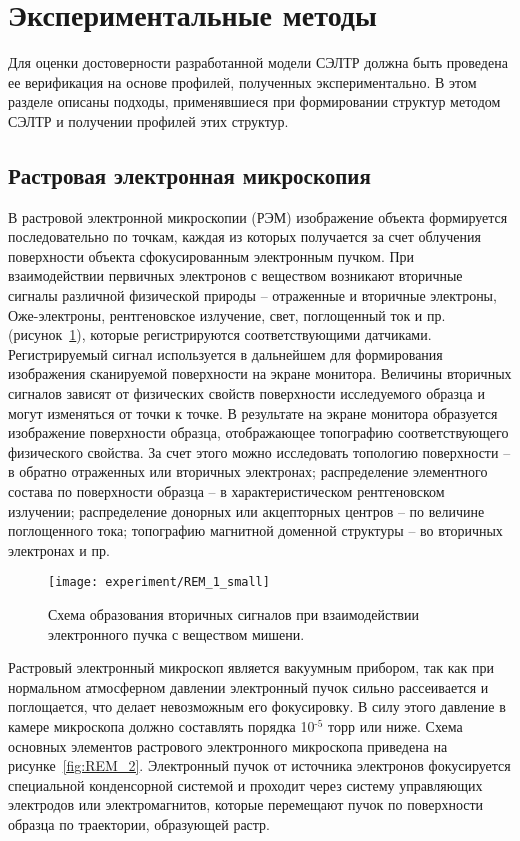\section{Экспериментальные методы}

Для оценки достоверности разработанной модели СЭЛТР должна быть проведена ее верификация на основе профилей, полученных экспериментально. В этом разделе описаны подходы, применявшиеся при формировании структур методом СЭЛТР и получении профилей этих структур.

\subsection*{Растровая электронная микроскопия}

В растровой электронной микроскопии (РЭМ) изображение объекта формируется последовательно по точкам, каждая из которых получается за счет облучения поверхности объекта сфокусированным электронным пучком. При взаимодействии первичных электронов с веществом возникают вторичные сигналы различной физической природы -- отраженные и вторичные электроны, Оже-электроны, рентгеновское излучение, свет, поглощенный ток и пр. (рисунок~\ref{fig:REM_1}), которые регистрируются соответствующими датчиками. Регистрируемый сигнал используется в дальнейшем для формирования изображения сканируемой поверхности на экране монитора. Величины вторичных сигналов зависят от физических свойств поверхности исследуемого образца и могут изменяться от точки к точке. В результате на экране монитора образуется изображение поверхности образца, отображающее топографию соответствующего физического свойства. За счет этого можно исследовать топологию поверхности -- в обратно отраженных или вторичных электронах; распределение элементного состава по поверхности образца -- в характеристическом рентгеновском излучении; распределение донорных или акцепторных центров -- по величине поглощенного тока; топографию магнитной доменной структуры -- во вторичных электронах и пр.

\begin{figure}
	\centering
	\texttt{[image: experiment/REM\_1\_small]}
	\caption{Схема образования вторичных сигналов при взаимодействии электронного пучка с веществом мишени.}
	\label{fig:REM_1}
\end{figure}

Растровый электронный микроскоп является вакуумным прибором, так как при нормальном атмосферном давлении электронный пучок сильно рассеивается и поглощается, что делает невозможным его фокусировку. В силу этого давление в камере микроскопа должно составлять порядка 10$^\text{-5}$ торр или ниже. Схема основных элементов растрового электронного микроскопа приведена на рисунке~\ref{fig:REM_2}. Электронный пучок от источника электронов фокусируется специальной конденсорной системой и проходит через систему управляющих электродов или электромагнитов, которые перемещают пучок по поверхности образца по траектории, образующей растр.

